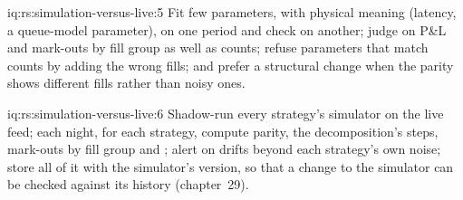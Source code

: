 \begin{solution}{iq:rs:simulation-versus-live:5}
Fit few parameters, with physical meaning (latency, a queue-model parameter), on one period and check on another; judge on P\&L and mark-outs by fill group as well as
counts; refuse parameters that match counts by adding the wrong fills; and prefer a structural change when the parity shows different fills rather than noisy ones.
\end{solution}

\begin{solution}{iq:rs:simulation-versus-live:6}
Shadow-run every strategy's simulator on the live feed; each night, for each strategy, compute parity, the decomposition's steps, mark-outs by fill group and ; alert on drifts beyond each strategy's own noise; store all of it with the simulator's version, so that a change to the simulator can be checked against its
history (chapter~29).
\end{solution}
